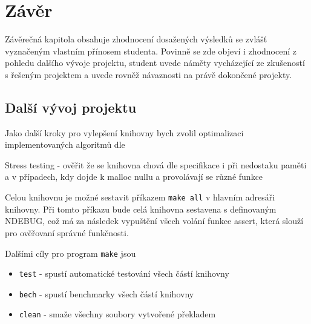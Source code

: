 
\chapter{Závěr}
Závěrečná kapitola obsahuje zhodnocení dosažených výsledků se zvlášť vyznačeným vlastním přínosem studenta. Povinně se zde objeví i zhodnocení z pohledu dalšího vývoje projektu, student uvede náměty vycházející ze zkušeností s řešeným projektem a uvede rovněž návaznosti na právě dokončené projekty.

\section{Další vývoj projektu}

Jako další kroky pro vylepšení knihovny bych zvolil optimalizaci implementovaných algoritmů dle

Stress testing
- ověřit že se knihovna chová dle specifikace i při nedostaku paměti a v případech, kdy dojde k malloc nullu
a provolávají se různé funkce


Celou knihovnu je možné sestavit příkazem \texttt{make all} v hlavním adresáři knihovny.
Při tomto příkazu bude celá knihovna sestavena s definovaným NDEBUG, což má za následek vypuštění všech
volání funkce assert, která slouží pro ověřovaní správné funkčnosti.

Dalšími cíly pro program \texttt{make} jsou

\begin{itemize}
	\item{\texttt{test} - spustí automatické testování všech částí knihovny}
	\item{\texttt{bech} - spustí benchmarky všech částí knihovny}
	\item{\texttt{clean} - smaže všechny soubory vytvořené překladem}
\end{itemize}
